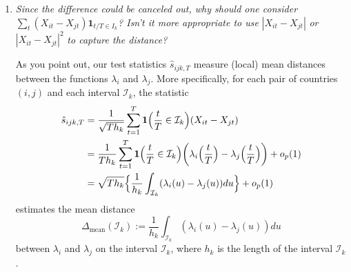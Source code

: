 \documentclass[a4paper,12pt]{article}
\begin{document}
\begin{enumerate}[label=(\arabic*),leftmargin=0.7cm]

\item \textit{Since the difference could be canceled out, why should one consider} $\sum\nolimits_t (X_{it} - X_{jt})\mathbf{1}_{t/T \in I_k}$\textit{? Isn't it more appropriate to use} $|X_{it} - X_{jt}|$ \textit{ or } $|X_{it} - X_{jt}|^2$ \textit{to capture the distance?}

As you point out, our test statistics $\hat{s}_{ijk,T}$ measure (local) mean distances between the functions $\lambda_i$ and $\lambda_j$. More specifically, for each pair of countries $(i,j)$ and each interval $\mathcal{I}_k$, the statistic
\begin{align*} 
\hat{s}_{ijk,T} 
 & = \frac{1}{\sqrt{Th_k}} \sum\limits_{t=1}^T \boldsymbol{1}\Big(\frac{t}{T} \in \mathcal{I}_k\Big) (X_{it} - X_{jt}) \\
 & = \frac{1}{Th_k} \sum\limits_{t=1}^T \boldsymbol{1}\Big(\frac{t}{T} \in \mathcal{I}_k\Big) \bigg( \lambda_i \Big(\frac{t}{T}\Big)  - \lambda_j \Big(\frac{t}{T}\Big)\bigg) + o_p(1) \\
 & = \sqrt{Th_k} \Big\{ \frac{1}{h_k} \int_{\mathcal{I}_k} (\lambda_i(u) - \lambda_j(u)) du \Big\} + o_p(1) 
\end{align*}
estimates the mean distance 
\[ \Delta_{\text{mean}}(\mathcal{I}_k) := \frac{1}{h_k} \int_{\mathcal{I}_k} (\lambda_i(u) - \lambda_j(u)) du \]
between $\lambda_i$ and $\lambda_j$ on the interval $\mathcal{I}_k$, where $h_k$ is the length of the interval $\mathcal{I}_k$. 
%
%

\end{enumerate}
\end{document}
